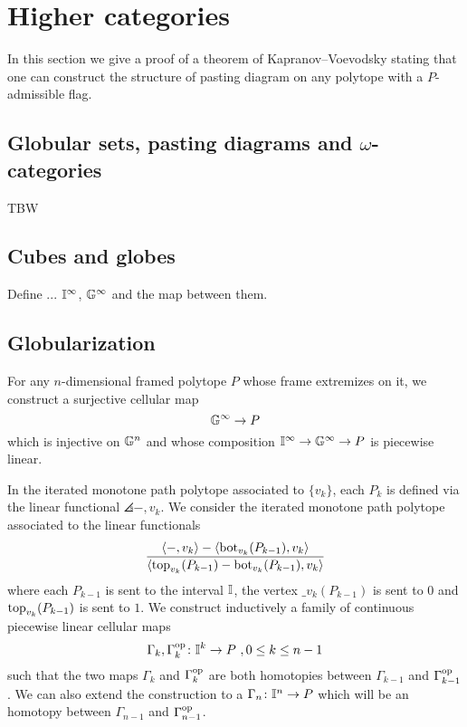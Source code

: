 
\section{Higher categories}

In this section we give a proof of a theorem of Kapranov--Voevodsky \cite{kapranov1991polycategory} stating that one can construct the structure of pasting diagram on any polytope with a $P$-admissible flag.

\subsection{Globular sets, pasting diagrams and $\omega$-categories}

TBW

\subsection{Cubes and globes}

Define ... $\mathbb{I}^\infty$, $\mathbb{G}^\infty$ and the map between them.

\subsection{Globularization}

For any $n$-dimensional framed polytope $P$ whose frame extremizes on it, we construct a surjective cellular map
\[
\mathbb{G}^\infty \to P
\]
which is injective on $\mathbb{G}^n$ and whose composition $\mathbb{I}^\infty \to \mathbb{G}^\infty \to P$ is piecewise linear.

In the iterated monotone path polytope associated to $\{v_k\}$, each $P_k$ is defined via the linear functional $\angles{-,v_k}$.
We consider the iterated monotone path polytope associated to the linear functionals
\begin{equation} \label{eq:new-projection}
	\frac{\langle-,v_k\rangle-\langle\operatorname{bot}_{v_k}(P_{k-1}),v_k\rangle}{\langle\operatorname{top}_{v_k}(P_{k-1})-\operatorname{bot}_{v_k}(P_{k-1}),v_k\rangle}
\end{equation}
where each $P_{k-1}$ is sent to the interval $\mathbb{I}$, the vertex $\bm_{v_k}(P_{k-1})$ is sent to $0$ and $\operatorname{top}_{v_k}(P_{k-1})$ is sent to $1$.
We construct inductively a family of continuous piecewise linear cellular maps
\[
\Gamma_k, \Gamma_k^{\mathrm{op}} \colon \mathbb{I}^k \to P \ , 0 \leq k \leq n-1
\]
such that the two maps $\Gamma_k$ and $\Gamma_k^{\mathrm{op}}$ are both homotopies between $\Gamma_{k-1}$ and $\Gamma_{k-1}^{\mathrm{op}}$.
We can also extend the construction to a $\Gamma_n \colon \mathbb{I}^n \to P$ which will be an homotopy between $\Gamma_{n-1}$ and $\Gamma_{n-1}^{\mathrm{op}}$.

